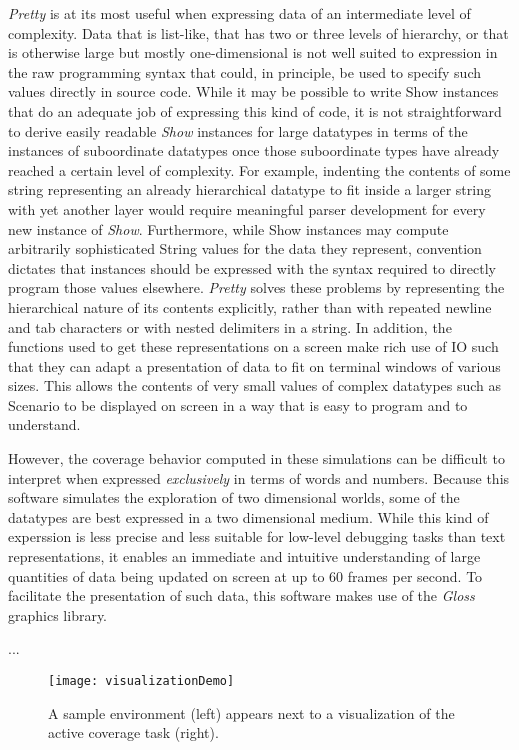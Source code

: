 \textit{Pretty} is at its most useful when expressing data of an intermediate level of complexity. Data that is list-like, that has two or three levels of hierarchy, or that is otherwise large but mostly one-dimensional is not well suited to expression in the raw programming syntax that could, in principle, be used to specify such values directly in source code. While it may be possible to write Show instances that do an adequate job of expressing this kind of code, it is not straightforward to derive easily readable \textit{Show} instances for large datatypes in terms of the instances of suboordinate datatypes once those suboordinate types have already reached a certain level of complexity. For example, indenting the contents of some string representing an already hierarchical datatype to fit inside a larger string with yet another layer would require meaningful parser development for every new instance of \textit{Show}. Furthermore, while Show instances may compute arbitrarily sophisticated String values for the data they represent, convention dictates that instances should be expressed with the syntax required to directly program those values elsewhere. \textit{Pretty} solves these problems by representing the hierarchical nature of its contents explicitly, rather than with repeated newline and tab characters or with nested delimiters in a string. In addition, the functions used to get these representations on a screen make rich use of IO such that they can adapt a presentation of data to fit on terminal windows of various sizes. This allows the contents of very small values of complex datatypes such as Scenario to be displayed on screen in a way that is easy to program and to understand.

However, the coverage behavior computed in these simulations can be difficult to interpret when expressed \textit{exclusively} in terms of words and numbers. Because this software simulates the exploration of two dimensional worlds, some of the datatypes are best expressed in a two dimensional medium. While this kind of experssion is less precise and less suitable for low-level debugging tasks than text representations, it enables an immediate and intuitive understanding of large quantities of data being updated on screen at up to 60 frames per second. To facilitate the presentation of such data, this software makes use of the \textit{Gloss} graphics library.

...

\begin{figure}[H]
\texttt{[image: visualizationDemo]}
\caption[Visualization of a Small Environment During Coverage]{A sample environment (left) appears next to a visualization of the active coverage task (right).}
\label {fig:VizDemo}
\end{figure}

